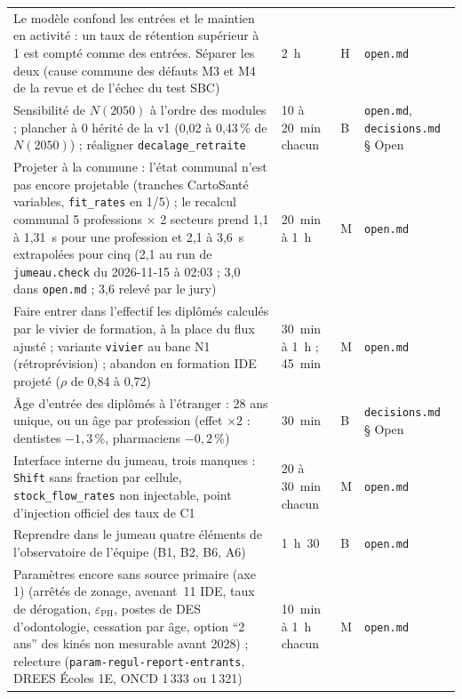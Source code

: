 \begin{small}
\begin{longtable}{@{}p{}p{}p{}p{}@{}}
Le modèle confond les entrées et le maintien en activité : un taux de rétention supérieur à 1 est compté comme des entrées. Séparer les deux (cause commune des défauts M3 et M4 de la revue et de l'échec du test SBC) & 2\suppose{}~h & H & \texttt{open.md} \\
Sensibilité de $N(2050)$ à l'ordre des modules ; plancher à 0 hérité de la v1 (0,02 à 0,43\mesure{}\,\% de $N(2050)$) ; réaligner \texttt{decalage\_\allowbreak{}retraite} & 10 à 20\suppose{}~min chacun & B & \texttt{open.md}, \texttt{decisions.md} § Open \\
Projeter à la commune : l'état communal n'est pas encore projetable (tranches CartoSanté variables, \texttt{fit\_\allowbreak{}rates} en 1/5) ; le recalcul communal 5 professions $\times$ 2 secteurs prend 1,1 à 1,31\mesure{}~s pour une profession et 2,1 à 3,6\derive{}~s extrapolées pour cinq (2,1 au run de \texttt{jumeau.check} du 2026-11-15 à 02:03 ; 3,0 dans \texttt{open.md} ; 3,6 relevé par le jury) & 20\suppose{}~min à 1\suppose{}~h & M & \texttt{open.md} \\
Faire entrer dans l'effectif les diplômés calculés par le vivier de formation, à la place du flux ajusté ; variante \texttt{vivier} au banc N1 (rétroprévision) ; abandon en formation IDE projeté ($\rho$ de 0,84 à 0,72\mesure{}) & 30\suppose{}~min à 1\suppose{}~h ; 45\suppose{}~min & M & \texttt{open.md} \\
Âge d'entrée des diplômés à l'étranger : 28\suppose{} ans unique, ou un âge par profession (effet $\times2$ : dentistes $-1{,}3$\mesure{}\,\%, pharmaciens $-0{,}2$\mesure{}\,\%) & 30\suppose{}~min & B & \texttt{decisions.md} § Open \\
Interface interne du jumeau, trois manques : \texttt{Shift} sans fraction par cellule, \texttt{stock\_\allowbreak{}flow\_\allowbreak{}rates} non injectable, point d'injection officiel des taux de C1 & 20 à 30\suppose{}~min chacun & M & \texttt{open.md} \\
Reprendre dans le jumeau quatre éléments de l'observatoire de l'équipe (B1, B2, B6, A6) & 1\suppose{}~h~30 & B & \texttt{open.md} \\
Paramètres encore sans source primaire (axe 1) (arrêtés de zonage, avenant~11 IDE, taux de dérogation, $\varepsilon_\mathrm{PH}$, postes de DES d'odontologie, cessation par âge, option \enquote{2 ans} des kinés non mesurable avant 2028) ; relecture (\texttt{param-\allowbreak{}regul-\allowbreak{}report-\allowbreak{}entrants}, DREES Écoles 1E, ONCD 1\,333 ou 1\,321\mesure{}) & 10\suppose{}~min à 1\suppose{}~h chacun & M & \texttt{open.md} \\

\end{longtable}
\end{small}
